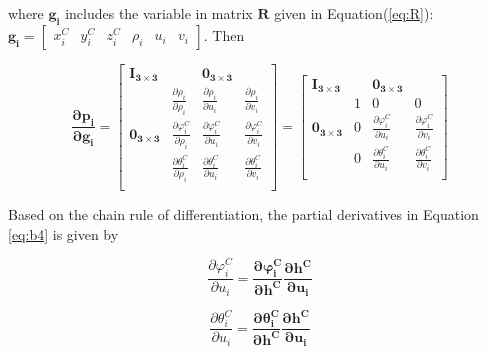 \noindent where $\boldsymbol{g_{i}}$ includes the variable in matrix $\boldsymbol{R}$ given in
Equation(\ref{eq:R}): $\boldsymbol{g_{i}}=[\begin{matrix} x_{i}^{C} & y_{i}^{C} &
  z_{i}^{C} & \rho _{i} & u_{i} & v_{i}\end{matrix}]$. Then 

\begin{equation}
\label{eq:b4}
\boldsymbol{\frac{\partial p_{i}}{\partial g_{i}}}=\begin{bmatrix}
\boldsymbol{I_{3\times 3}} & & \boldsymbol{0_{3\times 3}} & \\
 & \frac{\partial \rho_{i}}{\partial \rho_{i}} & 
\frac{\partial \rho_{i}}{\partial u_{i}} & 
\frac{\partial \rho _{i}}{\partial v_{i}}\\
\boldsymbol{0_{3\times 3}} & \frac{\partial \varphi_{i}^{C}}{\partial \rho_{i}} & 
\frac{\partial \varphi_{i}^{C}}{\partial u_{i}} & 
\frac{\partial \varphi_{i}^{C}}{\partial v_{i}} \\
 & \frac{\partial \theta_{i}^{C}}{\partial \rho_{i}} & 
\frac{\partial \theta_{i}^{C}}{\partial u_{i}} & 
\frac{\partial \theta_{i}^{C}}{\partial v_{i}} \\
\end{bmatrix} = \begin{bmatrix}
\boldsymbol{I_{3\times 3}} & & \boldsymbol{0_{3\times 3}} & \\
 & 1 & 0 & 0 \\
\boldsymbol{0_{3\times 3}} & 0 & \frac{\partial \varphi _{i}^{C}}{\partial u_{i}} 
& \frac{\partial \varphi_{i}^{C}}{\partial v_{i}} \\
 & 0 & \frac{\partial \theta_{i}^{C}}{\partial u_{i}} & 
\frac{\partial \theta_{i}^{C}}{\partial v_{i}} \\
\end{bmatrix}
\end{equation}

\noindent Based on the chain rule of differentiation, the partial
derivatives in Equation \ref{eq:b4} is given by

\begin{equation}
\label{eq:b5}
\frac{\partial \varphi_{i}^{C}}{\partial u_{i}}=
\boldsymbol{\frac{\partial \varphi_{i}^{C}}{\partial h^{C}}\frac{\partial h^{C}}{\partial u_{i}}}
\end{equation}

\begin{equation}
\label{eq:b6}
\frac{\partial \theta _{i}^{C}}{\partial u_{i}}=
\boldsymbol{\frac{\partial \theta_{i}^{C}}{\partial h^{C}}\frac{\partial h^{C}}{\partial u_{i}}}
\end{equation}

